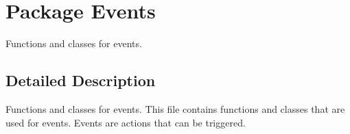\hypertarget{namespace_events}{
\section{Package Events}
\label{namespace_events}
}


Functions and classes for events.  




\subsection{Detailed Description}
Functions and classes for events. This file contains functions and classes that are used for events. Events are actions that can be triggered. 